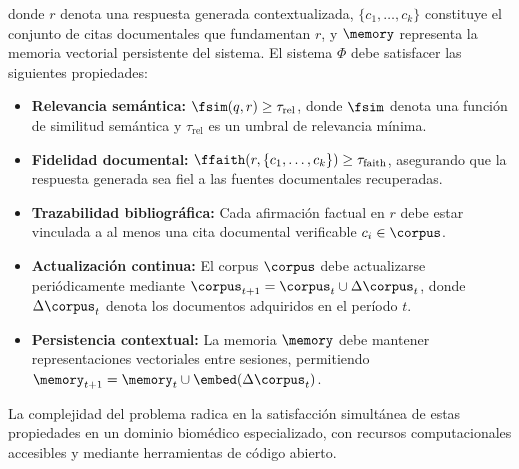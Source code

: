 \noindent donde $r$ denota una respuesta generada contextualizada, $\{c_1, \ldots, c_k\}$ constituye el conjunto de citas documentales que fundamentan $r$, y $\memory$ representa la memoria vectorial persistente del sistema. El sistema $\Phi$ debe satisfacer las siguientes propiedades:

\begin{itemize}[leftmargin=*]
  \item \textbf{Relevancia semántica:} $\fsim(q, r) \geq \tau_{\text{rel}}$, donde $\fsim$ denota una función de similitud semántica y $\tau_{\text{rel}}$ es un umbral de relevancia mínima.

  \item \textbf{Fidelidad documental:} $\ffaith(r, \{c_1, \ldots, c_k\}) \geq \tau_{\text{faith}}$, asegurando que la respuesta generada sea fiel a las fuentes documentales recuperadas.

  \item \textbf{Trazabilidad bibliográfica:} Cada afirmación factual en $r$ debe estar vinculada a al menos una cita documental verificable $c_i \in \corpus$.

  \item \textbf{Actualización continua:} El corpus $\corpus$ debe actualizarse periódicamente mediante $\corpus_{t+1} = \corpus_t \cup \Delta\corpus_t$, donde $\Delta\corpus_t$ denota los documentos adquiridos en el período $t$.

  \item \textbf{Persistencia contextual:} La memoria $\memory$ debe mantener representaciones vectoriales entre sesiones, permitiendo $\memory_{t+1} = \memory_t \cup \embed(\Delta\corpus_t)$.
\end{itemize}

\noindent La complejidad del problema radica en la satisfacción simultánea de estas propiedades en un dominio biomédico especializado, con recursos computacionales accesibles y mediante herramientas de código abierto.
